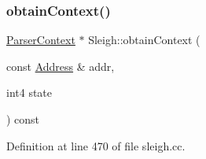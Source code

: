 \subsubsection{\texorpdfstring{obtainContext()}{obtainContext()}}
{\footnotesize\ttfamily \mbox{\hyperlink{class_parser_context}{Parser\+Context}} $\ast$ Sleigh\+::obtain\+Context (\begin{DoxyParamCaption}\item[{const \mbox{\hyperlink{class_address}{Address}} \&}]{addr,  }\item[{int4}]{state }\end{DoxyParamCaption}) const\hspace{0.3cm}{\ttfamily [protected]}}



Definition at line 470 of file sleigh.\+cc.

